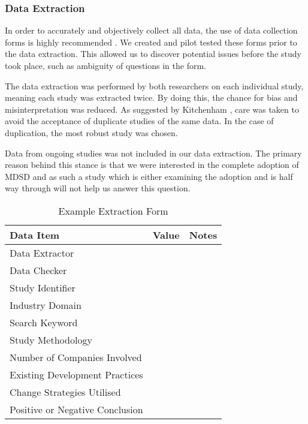 \documentclass[10pt,twocolumn]{article}
\begin{document}
\subsubsection{Data Extraction}

In order to accurately and objectively collect all data, the use of data collection forms is highly recommended \cite{kitchenham2007guidelines}. We created and pilot tested these forms prior to the data extraction. This allowed us to discover potential issues before the study took place, such as ambiguity of questions in the form.

The data extraction was performed by both researchers on each individual study, meaning each study was extracted twice. By doing this, the chance for bias and misinterpretation was reduced. As suggested by Kitchenham \cite{kitchenham2007guidelines}, care was taken to avoid the acceptance of duplicate studies of the same data. In the case of duplication, the most robust study was chosen.

Data from ongoing studies was not included in our data extraction. The primary reason behind this stance is that we were interested in the complete adoption of MDSD and as such a study which is either examining the adoption and is half way through will not help us answer this question.

\begin{table}[ht]
	\centering
	\begin{tabular}{|l|l|l|} 
		\hline
		\textbf{Data Item} & \textbf{Value} & \textbf{Notes}  \\
		\hline
		Data Extractor &  &  \\
		\hline
		Data Checker &  & \\
		\hline
		Study Identifier &  & \\
		\hline
		Industry Domain & & \\
		\hline
		Search Keyword &  & \\
		\hline
		Study Methodology & & \\
		\hline
		Number of Companies Involved &  & \\
		\hline
		Existing Development Practices & & \\
		\hline
		Change Strategies Utilised & & \\
		\hline
		Positive or Negative Conclusion & & \\
		\hline
	\end{tabular}
	\caption{Example Extraction Form}
\end{table}
\end{document}
